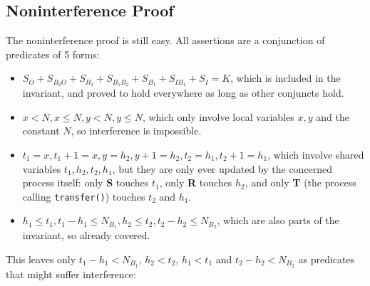 \documentclass[a4paper, 11pt]{article}
\begin{document}
\subsection*{Noninterference Proof}
The noninterference proof is still easy. All assertions are a conjunction of predicates of 5 forms:
\begin{itemize}
    \item $S_O+S_{B_2O}+S_{B_2}+S_{B_1B_2}+S_{B_1}+S_{IB_1}+S_I = K$, which is included in the invariant, and proved to hold everywhere as long as other conjuncts hold.
    \item $x<N, x \leq N, y < N, y \leq N$, which only involve local variables $x,y$ and the constant $N$, so interference is impossible.
    \item $t_1=x, t_1+1=x, y=h_2, y+1=h_2, t_2=h_1, t_2+1=h_1$, which involve shared variables $t_1,h_2,t_2,h_1$, but they are only ever updated by the concerned process itself: only \textbf{S} touches $t_1$, only \textbf{R} touches $h_2$, and only \textbf{T} (the process calling \texttt{transfer()}) touches $t_2$ and $h_1$.
    \item $h_1 \leq t_1, t_1 - h_1 \leq N_{B_1}, h_2 \leq t_2, t_2 - h_2 \leq N_{B_2}$, which are also parts of the invariant, so already covered.
\end{itemize}

This leaves only $t_1-h_1<N_{B_1}$, $h_2<t_2$, $h_1<t_1$ and $t_2-h_2<N_{B_2}$ as predicates that might suffer interference:
\end{document}
